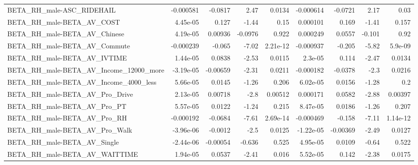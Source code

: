 \begin{tabular}{lrrrrrrrr}
BETA\_RH\_male-ASC\_RIDEHAIL                          &   -0.000581 &      -0.0817 &      2.47 &   0.0134 &  -0.000614 &     -0.0721 &         2.17 &          0.03 \\
BETA\_RH\_male-BETA\_AV\_COST                          &    4.45e-05 &        0.127 &     -1.44 &     0.15 &   0.000101 &       0.169 &        -1.41 &         0.157 \\
BETA\_RH\_male-BETA\_AV\_Chinese                       &    4.19e-05 &      0.00936 &   -0.0976 &    0.922 &   0.000249 &      0.0557 &       -0.101 &          0.92 \\
BETA\_RH\_male-BETA\_AV\_Commute                       &   -0.000239 &       -0.065 &     -7.02 & 2.21e-12 &  -0.000937 &      -0.205 &        -5.82 &       5.9e-09 \\
BETA\_RH\_male-BETA\_AV\_IVTIME                        &    1.44e-05 &       0.0838 &     -2.53 &   0.0115 &    2.3e-05 &       0.114 &        -2.47 &        0.0134 \\
BETA\_RH\_male-BETA\_AV\_Income\_12000\_more             &   -3.19e-05 &     -0.00659 &     -2.31 &   0.0211 &  -0.000182 &     -0.0378 &         -2.3 &        0.0216 \\
BETA\_RH\_male-BETA\_AV\_Income\_4000\_less              &    5.66e-05 &       0.0145 &     -1.26 &    0.206 &   6.02e-05 &      0.0156 &        -1.28 &           0.2 \\
BETA\_RH\_male-BETA\_AV\_Pro\_Drive                     &    2.13e-05 &      0.00718 &      -2.8 &  0.00512 &   0.000171 &      0.0582 &        -2.88 &       0.00397 \\
BETA\_RH\_male-BETA\_AV\_Pro\_PT                        &    5.57e-05 &       0.0122 &     -1.24 &    0.215 &   8.47e-05 &      0.0186 &        -1.26 &         0.207 \\
BETA\_RH\_male-BETA\_AV\_Pro\_RH                        &   -0.000192 &      -0.0684 &     -7.61 & 2.69e-14 &  -0.000469 &      -0.158 &        -7.11 &      1.14e-12 \\
BETA\_RH\_male-BETA\_AV\_Pro\_Walk                      &   -3.96e-06 &      -0.0012 &      -2.5 &   0.0125 &  -1.22e-05 &    -0.00369 &        -2.49 &        0.0127 \\
BETA\_RH\_male-BETA\_AV\_Single                        &   -2.44e-06 &     -0.00054 &    -0.636 &    0.525 &   4.95e-05 &      0.0109 &        -0.64 &         0.522 \\
BETA\_RH\_male-BETA\_AV\_WAITTIME                      &    1.94e-05 &       0.0537 &     -2.41 &    0.016 &   5.52e-05 &       0.142 &        -2.38 &        0.0175 \\

\end{tabular}
